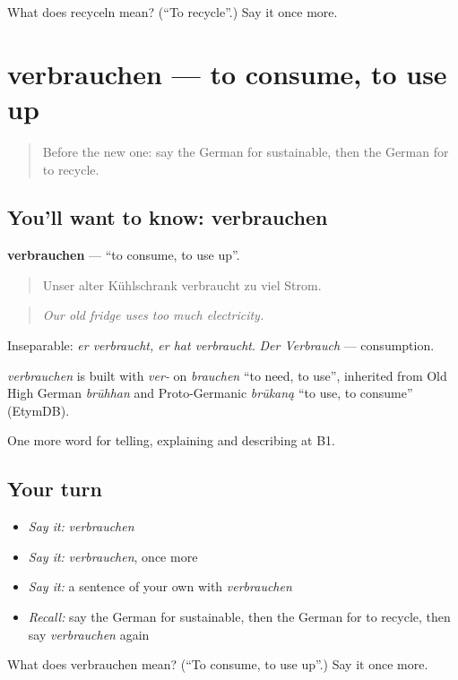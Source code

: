 \begin{tcolorbox}[breakable,colback=teal!4,colframe=teal!35!black,title={Before you move on}]
What does recyceln mean? (\textquotedblleft{}To recycle\textquotedblright{}.) Say it once more.
\end{tcolorbox}
\section[verbrauchen]{verbrauchen — to consume, to use up}

\label{lesson:GE-C363-verbrauchen}



\begin{quote}
Before the new one: say the German for sustainable, then the German for to recycle.
\end{quote}

\subsection*{You'll want to know: verbrauchen}
\textbf{verbrauchen} — \textquotedblleft{}to consume, to use up\textquotedblright{}.

\begin{quote}
Unser alter Kühlschrank verbraucht zu viel Strom.
\end{quote}

\begin{quote}
\emph{Our old fridge uses too much electricity.}
\end{quote}

Inseparable: \emph{er verbraucht, er hat verbraucht}. \emph{Der Verbrauch} — consumption.

\begin{cousinweb}
\emph{verbrauchen} is built with \emph{ver-} on \emph{brauchen} \textquotedblleft{}to need, to use\textquotedblright{}, inherited from Old High German \emph{brūhhan} and Proto-Germanic \emph{brūkaną} \textquotedblleft{}to use, to consume\textquotedblright{} (EtymDB).
\end{cousinweb}

\begin{grammarlens}[title={What you've built}]
One more word for telling, explaining and describing at B1.
\end{grammarlens}

\subsection*{Your turn}
\begin{itemize}
\raggedright
  \item \emph{Say it:} \emph{verbrauchen}
  \item \emph{Say it:} \emph{verbrauchen}, once more
  \item \emph{Say it:} a sentence of your own with \emph{verbrauchen}
  \item \emph{Recall:} say the German for sustainable, then the German for to recycle, then say \emph{verbrauchen} again
\end{itemize}

\begin{tcolorbox}[breakable,colback=teal!4,colframe=teal!35!black,title={Before you move on}]
What does verbrauchen mean? (\textquotedblleft{}To consume, to use up\textquotedblright{}.) Say it once more.
\end{tcolorbox}
